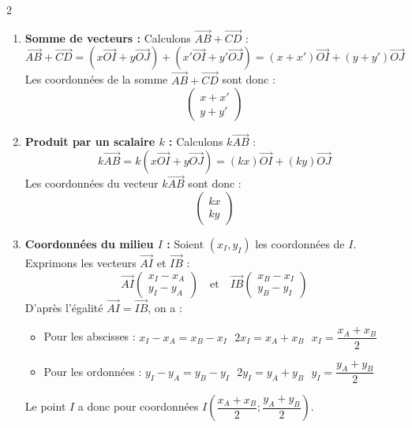 \begin{multicols*}{2}
\begin{enumerate}
  		\item \textbf{Somme de vecteurs :}
  		Calculons $\overrightarrow{AB} + \overrightarrow{CD}$ :
  		\[ \overrightarrow{AB} + \overrightarrow{CD} = (x\overrightarrow{OI} + y\overrightarrow{OJ}) + (x'\overrightarrow{OI} + y'\overrightarrow{OJ}) = (x + x')\overrightarrow{OI} + (y + y')\overrightarrow{OJ} \]
  		Les coordonnées de la somme $\overrightarrow{AB} + \overrightarrow{CD}$ sont donc :
  		\[ \begin{pmatrix} x + x' \\ y + y' \end{pmatrix} \]
  		
  		\item \textbf{Produit par un scalaire $k$ :}
  		Calculons $k\overrightarrow{AB}$ :
  		\[ k\overrightarrow{AB} = k(x\overrightarrow{OI} + y\overrightarrow{OJ}) = (kx)\overrightarrow{OI} + (ky)\overrightarrow{OJ} \]
  		Les coordonnées du vecteur $k\overrightarrow{AB}$ sont donc :
  		\[ \begin{pmatrix} kx \\ ky \end{pmatrix} \]
  		
  		\item \textbf{Coordonnées du milieu $I$ :}
  		Soient $(x_I, y_I)$ les coordonnées de $I$. Exprimons les vecteurs $\overrightarrow{AI}$ et $\overrightarrow{IB}$ :
  		\[ \overrightarrow{AI} \begin{pmatrix} x_I - x_A \\ y_I - y_A \end{pmatrix} \quad \text{et} \quad \overrightarrow{IB} \begin{pmatrix} x_B - x_I \\ y_B - y_I \end{pmatrix} \]
  		D'après l'égalité $\overrightarrow{AI} = \overrightarrow{IB}$, on a :
  		\begin{itemize}
  			\item Pour les abscisses : $x_I - x_A = x_B - x_I \mbox{  } 2x_I = x_A + x_B \mbox{  } x_I = \dfrac{x_A + x_B}{2}$
  			\item Pour les ordonnées : $y_I - y_A = y_B - y_I \mbox{  } 2y_I = y_A + y_B \mbox{  } y_I = \dfrac{y_A + y_B}{2}$
  		\end{itemize}
  		Le point $I$ a donc pour coordonnées $I\left( \dfrac{x_A + x_B}{2} ; \dfrac{y_A + y_B}{2} \right)$.
  	\end{enumerate}
  	

\end{multicols*}

